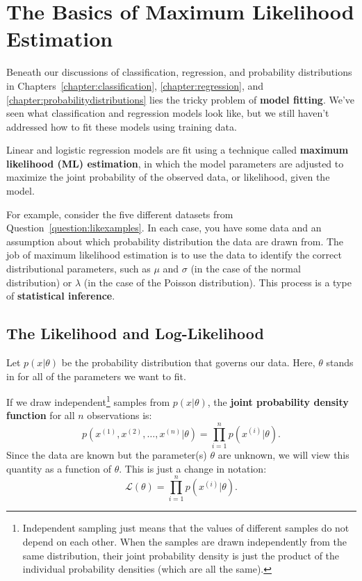 \chapter{The Basics of Maximum Likelihood Estimation \label{chapter:mlebasics}}

Beneath our discussions of classification, regression, and probability distributions in Chapters~\ref{chapter:classification}, \ref{chapter:regression}, and \ref{chapter:probabilitydistributions} lies the tricky problem of \textbf{model fitting}. We've seen what classification and regression models look like, but we still haven't addressed how to fit these models using training data.

Linear and logistic regression models are fit using a technique called \textbf{maximum likelihood (ML) estimation}, in which the model parameters are adjusted to maximize the joint probability of the observed data, or likelihood, given the model. 

For example, consider the five different datasets from Question~\ref{question:likexamples}. In each case, you have some data and an assumption about which probability distribution the data are drawn from. The job of maximum likelihood estimation is to use the data to identify the correct distributional parameters, such as $\mu$ and $\sigma$ (in the case of the normal distribution) or $\lambda$ (in the case of the Poisson distribution). This process is a type of \textbf{statistical inference}. 

\section{The Likelihood and Log-Likelihood}

Let $p(x|\theta)$ be the probability distribution that governs our data. Here, $\theta$ stands in for all of the parameters we want to fit. 

If we draw independent\footnote{Independent sampling just means that the values of different samples do not depend on each other. When the samples are drawn independently from the same distribution, their joint probability density is just the product of the individual probability densities (which are all the same).} samples from $p(x|\theta)$, the {\bf joint probability density function} for all $n$ observations is:
$$ p(x^{(1)}, x^{(2)}, \dots, x^{(n)}|\theta) = \prod_{i=1}^n p(x^{(i)}|\theta). $$
Since the data are known but the parameter(s) $\theta$ are unknown, we will view this quantity as a function of $\theta$. This is just a change in notation:
$$ \mathcal{L}(\theta) = \prod_{i=1}^n p(x^{(i)}|\theta). $$

